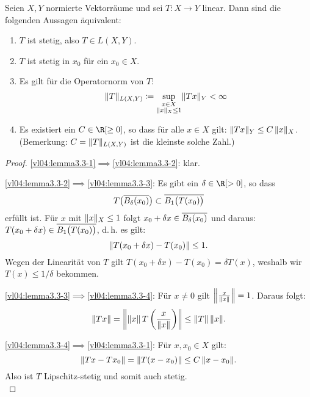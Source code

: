 \begin{thLemma}
    Seien $X,Y$ normierte Vektorräume und sei $T\colon X\to Y$ linear. Dann sind
    die folgenden Aussagen äquivalent:
    \begin{enumerate}[(1)]
        \item \label{vl04:lemma3.3-1}
            $T$ ist stetig, also $T\in L(X,Y)$.
        \item \label{vl04:lemma3.3-2}
            $T$ ist stetig in $x_0$ für ein $x_0\in X$.
        \item \label{vl04:lemma3.3-3}
            Es gilt für die Operatornorm von $T$:\quad
            \[ \opnorm{T}_{L(X,Y)} \defeq 
                \sup_{\substack{x\in X\\\norm{x}_X\leq1}} \norm{Tx}_Y < \infty
            \]
        \item \label{vl04:lemma3.3-4}
            Es existiert ein $C\in\R[\geq0]$, so dass für alle $x\in X$ gilt:
            $\norm{Tx}_Y \leq C\,\norm{x}_X$.
            (Bemerkung: $C = \norm{T}_{L(X,Y)}$ ist die kleinste solche Zahl.)
    \end{enumerate}
\end{thLemma}

\begin{proof}
    \ref{vl04:lemma3.3-1}$\implies$\ref{vl04:lemma3.3-2}: klar.
    
    \ref{vl04:lemma3.3-2}$\implies$\ref{vl04:lemma3.3-3}:
    Es gibt ein $\delta\in\R[>0]$, so dass
    \[ T\bigl( \setclosure{ B_\delta(x_0) } \bigr)
        \subset \setclosure{ B_1\bigl( T(x_0) \bigr) }
    \]
    erfüllt ist. Für $x$ mit $\norm{x}_X\leq 1$ folgt $x_0+\delta x\in
    \setclosure{ B_\delta(x_0) }$ und daraus: $T(x_0+\delta x) \in \setclosure{
    B_1\bigl(T(x_0)\bigr) }$, d.\,h. es gilt:
    \[ \norm{ T(x_0+\delta x) - T(x_0) } \leq 1 . \]
    Wegen der Linearität von $T$ gilt $T(x_0+\delta x) - T(x_0) = \delta
    T(x)$, weshalb wir $T(x)\leq 1/\delta$ bekommen.
    
    \ref{vl04:lemma3.3-3}$\implies$\ref{vl04:lemma3.3-4}: Für $x\neq 0$ gilt
    $\norm*{ \frac{x}{\norm{x}} } = 1$. Daraus folgt:
    \[ \norm{Tx} = \norm*{ \norm{x} \, T\left( \frac{x}{\norm{x}} \right) }
        \leq \norm{T} \, \norm{x}
    . \]
    
    \ref{vl04:lemma3.3-4}$\implies$\ref{vl04:lemma3.3-1}: 
    Für $x,x_0\in X$ gilt:
    \[ \norm{Tx-Tx_0} = \norm{T(x-x_0)} \leq C\,\norm{x-x_0}  . \]
    Also ist $T$ Lipschitz-stetig und somit auch stetig.
    \\
\end{proof}

